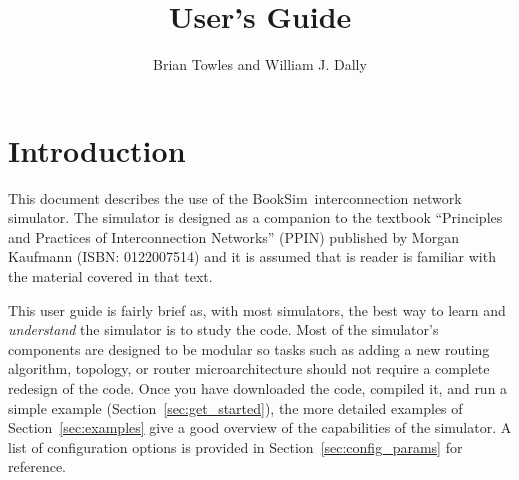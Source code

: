 \documentclass[11pt]{article}
\author{Brian Towles and William J. Dally}
\title{\simname 1.0 User's Guide}
\newcommand{\simname}{BookSim~}
\begin{document}
\maketitle
\tableofcontents

\pagestyle{fancy}
\renewcommand{\sectionmark}[1]{\markright{\thesection\ #1}}
\fancyhf{} %
\fancyhead[LE,RO]{\bfseries\thepage}
\fancyhead[LO]{\bfseries\rightmark}
\fancyhead[RE]{\bfseries\leftmark}
\renewcommand{\headrulewidth}{0.5pt}
\renewcommand{\footrulewidth}{0.5pt}
\addtolength{\headheight}{0.5pt} %
\cfoot{\small\today}
\fancypagestyle{plain}{%
    \fancyhf{} %
    \renewcommand{\headrulewidth}{0pt} %
    \renewcommand{\footrulewidth}{0pt} %
} 



\newenvironment{opt_list}[1]{\begin{list}{}{\renewcommand{\makelabel}[1]%
{\texttt{##1}\hfil}\settowidth{\labelwidth}{\texttt{#1}}\setlength{\leftmargin}%
{\labelwidth+\labelsep}}}{\end{list}}

\section{Introduction}

This document describes the use of the \simname interconnection
network simulator.  The simulator is designed as a companion to the
textbook ``Principles and Practices of Interconnection Networks''
(PPIN) published by Morgan Kaufmann (ISBN: 0122007514) and it is
assumed that is reader is familiar with the material covered in that
text.

This user guide is fairly brief as, with most simulators, the best way
to learn and {\it understand} the simulator is to study the code.
Most of the simulator's components are designed to be modular so tasks
such as adding a new routing algorithm, topology, or router
microarchitecture should not require a complete redesign of the code.
Once you have downloaded the code, compiled it, and run a simple
example (Section~\ref{sec:get_started}), the more detailed examples of
Section~\ref{sec:examples} give a good overview of the capabilities of
the simulator.  A list of configuration options is provided in
Section~\ref{sec:config_params} for reference.
\end{document}
